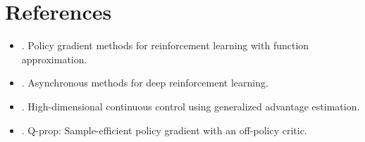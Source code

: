 \section{References}
\begin{itemize}
	\item {}. Policy gradient methods for reinforcement learning with function approximation.
	\item {}. Asynchronous methods for deep reinforcement learning.
	\item {}. High-dimensional continuous control using generalized advantage estimation.
	\item {}. Q-prop: Sample-efficient policy gradient with an off-policy critic.
\end{itemize}


